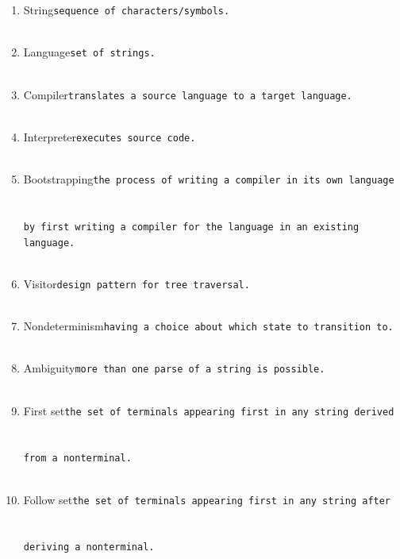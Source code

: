 \documentclass[10pt]{amsart}
\begin{document}
\begin{enumerate}
\item String\hfill\verb+sequence of characters/symbols.+\\\\ %
\item Language\hfill\verb+set of strings.+\\\\ %
\item Compiler\hfill\verb+translates a source language to a target language.+\\\\ %
\item Interpreter\hfill\verb+executes source code.+\\\\
\item Bootstrapping\hfill\verb+the process of writing a compiler in its own language+\\\\\\\verb+by first writing a compiler for the language in an existing language.+\\\\ %
\item Visitor\hfill\verb+design pattern for tree traversal.+\\\\
\item Nondeterminism\hfill\verb+having a choice about which state to transition to.+\\\\
\item Ambiguity\hfill\verb+more than one parse of a string is possible.+\\\\
\item First set\hfill\verb+the set of terminals appearing first in any string derived+\\\\\\\verb+from a nonterminal.+\\\\
\item Follow set\hfill\verb+the set of terminals appearing first in any string after+\\\\\\\verb+deriving a nonterminal.+
\end{enumerate}
\end{document}

